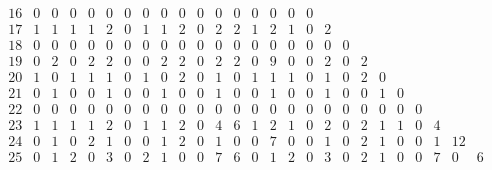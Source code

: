 \begin{landscape}
\[\begin{array}{c|ccccccccccccccccccccccccc}
16&  0&  0&  0&  0&  0&  0&  0&  0&  0&  0&  0&  0&  0&  0&  0&  0&   &   &   &   &   &   &   &   &   \\
17&  1&  1&  1&  1&  2&  0&  1&  1&  2&  0&  2&  2&  1&  2&  1&  0&  2&   &   &   &   &   &   &   &   \\
18&  0&  0&  0&  0&  0&  0&  0&  0&  0&  0&  0&  0&  0&  0&  0&  0&  0&  0&   &   &   &   &   &   &   \\
19&  0&  2&  0&  2&  2&  0&  0&  2&  2&  0&  2&  2&  0&  9&  0&  0&  2&  0&  2&   &   &   &   &   &   \\
20&  1&  0&  1&  1&  1&  0&  1&  0&  2&  0&  1&  0&  1&  1&  1&  0&  1&  0&  2&  0&   &   &   &   &   \\
21&  0&  1&  0&  0&  1&  0&  0&  1&  0&  0&  1&  0&  0&  1&  0&  0&  1&  0&  0&  1&  0&   &   &   &   \\
22&  0&  0&  0&  0&  0&  0&  0&  0&  0&  0&  0&  0&  0&  0&  0&  0&  0&  0&  0&  0&  0&  0&   &   &   \\
23&  1&  1&  1&  1&  2&  0&  1&  1&  2&  0&  4&  6&  1&  2&  1&  0&  2&  0&  2&  1&  1&  0&  4&   &   \\
24&  0&  1&  0&  2&  1&  0&  0&  1&  2&  0&  1&  0&  0&  7&  0&  0&  1&  0&  2&  1&  0&  0&  1& 12&   \\
25&  0&  1&  2&  0&  3&  0&  2&  1&  0&  0&  7&  6&  0&  1&  2&  0&  3&  0&  2&  1&  0&  0&  7&  0&  6\\
\end{array}
\]


\end{landscape}
